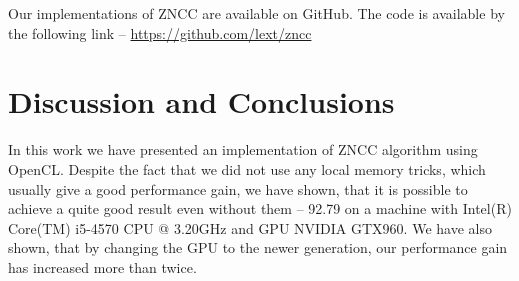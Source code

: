 \documentclass[conference]{IEEEtran}
\begin{document}
Our implementations of ZNCC are available on GitHub. The code is available by the following link -- \url{https://github.com/lext/zncc}

\section{Discussion and Conclusions}
In this work we have presented an implementation of ZNCC algorithm using OpenCL. Despite the fact that we did not use any local memory tricks, which usually give a good performance gain, we have shown, that it is possible to  achieve a quite good result even without them -- 92.79 on a machine with Intel(R) Core(TM) i5-4570 CPU @ 3.20GHz and GPU NVIDIA GTX960. We have also shown, that by changing the GPU to the newer generation, our performance gain has increased more than twice.



\end{document}
